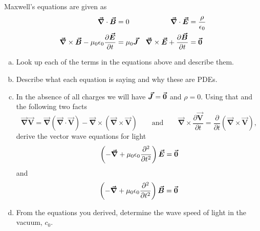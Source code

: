 \documentclass[12pt]{article} %
\newcommand{\grad}{\boldsymbol{\vec{\nabla}}}
\newcommand{\vecfieldE}{\boldsymbol{\vec{E}}}
\newcommand{\vecfieldB}{\boldsymbol{\vec{B}}}
\newcommand{\vecfieldJ}{\boldsymbol{\vec{J}}}
\newcommand{\veclaplace}{\boldsymbol{\vec{\nabla}}}
\newcommand{\vecfieldV}{\boldsymbol{\vec{V}}}
\begin{document}
\newpage
\begin{problem}
Maxwell's equations are given as
\begin{align*}
\grad \cdot \vecfieldB &= 0  & \grad \cdot \vecfieldE &= \frac{\rho}{\epsilon_0}\\
\grad \times \vecfieldB -\mu_0 \epsilon_0\frac{\partial \vecfieldE}{\partial t}&=\mu_0 \vecfieldJ & \grad \times \vecfieldE + \frac{\partial \vecfieldB}{\partial t} &= \zerovec
\end{align*}
\begin{enumerate}[(a)]
    \item Look up each of the terms in the equations above and describe them.
    \item Describe what each equation is saying and why these are PDEs.
    \item In the absence of all charges we will have $\vecfieldJ=\zerovec$ and $\rho=0$.  Using that and the following two facts
    \[
    \veclaplace \vecfieldV = \grad (\grad \cdot \vecfieldV) - \grad \times (\grad \times \vecfieldV) \qquad \textrm{and} \qquad \grad \times \frac{\partial \vecfieldV}{\partial t} = \frac{\partial}{\partial t} (\grad \times \vecfieldV),
    \]
    derive the vector wave equations for light
    \[
    \left( - \veclaplace + \mu_0 \epsilon_0 \frac{\partial^2 }{\partial t^2}\right) \vecfieldE = \zerovec
    \]
    and
    \[
    \left( - \veclaplace + \mu_0 \epsilon_0 \frac{\partial^2 }{\partial t^2}\right) \vecfieldB = \zerovec
    \]
    \item From the equations you derived, determine the wave speed of light in the vacuum, $c_0$.
\end{enumerate}
\end{problem}
\end{document}
